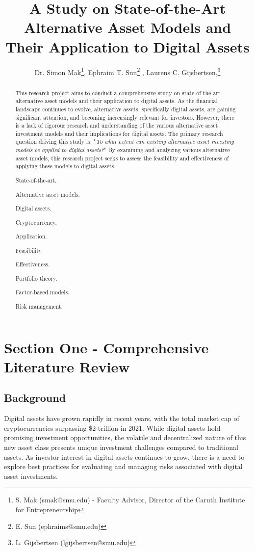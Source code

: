 \documentclass{ledger}
\title{A Study on State-of-the-Art Alternative Asset Models and Their Application to Digital Assets
}
\author{Dr. Simon Mak\thanks{S. Mak (smak@smu.edu) - Faculty Advisor, Director of the Caruth Institute for Entrepreneurship}, Ephraim T. Sun\thanks{E. Sun (ephraims@smu.edu)} , Laurens C. Gijsbertsen,\thanks{L. Gijsbertsen (lgijsbertsen@smu.edu)}}
\begin{document}
\maketitle

\thispagestyle{pagefirst}

\begin{abstract}
This research project aims to conduct a comprehensive study on state-of-the-art alternative asset models and their application to digital assets. As the financial landscape continues to evolve, alternative assets, specifically digital assets, are gaining significant attention, and becoming increasingly relevant for investors. However, there is a lack of rigorous research and understanding of the various alternative asset investment models and their implications for digital assets. The primary research question driving this study is: "\textit{To what extent can existing alternative asset investing models be applied to digital assets?}" By examining and analyzing various alternative asset models, this research project seeks to assess the feasibility and effectiveness of applying these models to digital assets.

\begin{keywords}
\item State-of-the-art.
\item Alternative asset models.
\item Digital assets.
\item Cryptocurrency.
\item Application.
\item Feasibility.
\item Effectiveness.
\item Portfolio theory.
\item Factor-based models.
\item Risk management.
\end{keywords}
\end{abstract}

\section{Section One - Comprehensive Literature Review}
\subsection{Background}
Digital assets have grown rapidly in recent years, with the total market cap of cryptocurrencies surpassing \$2 trillion in 2021. While digital assets hold promising investment opportunities, the volatile and decentralized nature of this new asset class presents unique investment challenges compared to traditional assets. As investor interest in digital assets continues to grow, there is a need to explore best practices for evaluating and managing risks associated with digital asset investments.
\end{document}
